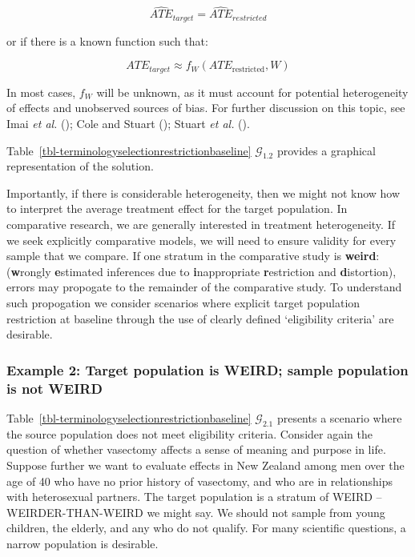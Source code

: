 \documentclass[
  single column]{article}
\begin{document}
\[
\widehat{ATE}_{target} = \widehat{ATE}_{restricted}
\]

or if there is a known function such that:

\[
ATE_{target} \approx f_W(ATE_{\text{restricted}}, W)
\]

In most cases, \(f_W\) will be unknown, as it must account for potential
heterogeneity of effects and unobserved sources of bias. For further
discussion on this topic, see Imai \emph{et al.}
(); Cole and Stuart
(); Stuart \emph{et al.}
().

Table~\ref{tbl-terminologyselectionrestrictionbaseline}
\(\mathcal{G}_{1.2}\) provides a graphical representation of the
solution.

Importantly, if there is considerable heterogeneity, then we might not
know how to interpret the average treatment effect for the target
population. In comparative research, we are generally interested in
treatment heterogeneity. If we seek explicitly comparative models, we
will need to ensure validity for every sample that we compare. If one
stratum in the comparative study is \textbf{weird}: (\textbf{w}rongly
\textbf{e}stimated inferences due to \textbf{i}nappropriate
\textbf{r}estriction and \textbf{d}istortion), errors may propogate to
the remainder of the comparative study. To understand such propogation
we consider scenarios where explicit target population restriction at
baseline through the use of clearly defined `eligibility criteria' are
desirable.

\subsubsection{Example 2: Target population is WEIRD; sample population
is not
WEIRD}\label{example-2-target-population-is-weird-sample-population-is-not-weird}

Table~\ref{tbl-terminologyselectionrestrictionbaseline}
\(\mathcal{G}_{2.1}\) presents a scenario where the source population
does not meet eligibility criteria. Consider again the question of
whether vasectomy affects a sense of meaning and purpose in life.
Suppose further we want to evaluate effects in New Zealand among men
over the age of 40 who have no prior history of vasectomy, and who are
in relationships with heterosexual partners. The target population is a
stratum of WEIRD -- WEIRDER-THAN-WEIRD we might say. We should not
sample from young children, the elderly, and any who do not qualify. For
many scientific questions, a narrow population is desirable.
\end{document}
